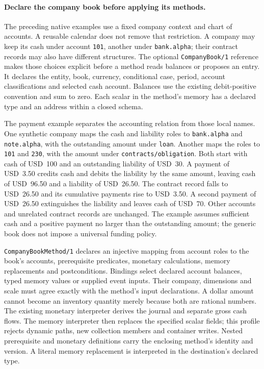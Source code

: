 \paragraph{Declare the company book before applying its methods.}
The preceding native examples use a fixed company context and chart of accounts.
A reusable calendar does not remove that restriction. A company may keep its cash
under account \texttt{101}, another under \texttt{bank.alpha}; their contract
records may also have different structures. The optional
\texttt{CompanyBook/1} reference makes those choices explicit before a method
reads balances or proposes an entry. It declares the entity, book, currency,
conditional case, period, account classifications and selected cash account.
Balances use the existing debit-positive convention and sum to zero. Each scalar
in the method's memory has a declared type and an address within a closed schema.

The payment example separates the accounting relation from those local names.
One synthetic company maps the cash and liability roles to
\texttt{bank.alpha} and \texttt{note.alpha}, with the outstanding amount under
\texttt{loan}. Another maps the roles to \texttt{101} and \texttt{230}, with the
amount under \texttt{contracts/obligation}. Both start with cash of USD~100 and an
outstanding liability of USD~30. A payment of USD~3.50 credits cash and debits
the liability by the same amount, leaving cash of USD~96.50 and a liability of
USD~26.50. The contract record falls to USD~26.50 and its cumulative payments
rise to USD~3.50. A second payment of USD~26.50 extinguishes the liability and
leaves cash of USD~70. Other accounts and unrelated contract records are unchanged.
The example assumes sufficient cash and a positive payment no larger than the
outstanding amount; the generic book does not impose a universal funding policy.

\texttt{CompanyBookMethod/1} declares an injective mapping from account roles to
the book's accounts, prerequisite predicates, monetary calculations, memory
replacements and postconditions. Bindings select declared account balances,
typed memory values or supplied event inputs. Their company, dimensions and
scale must agree exactly with the method's input declarations. A dollar amount
cannot become an inventory quantity merely because both are rational numbers.
The existing monetary interpreter derives the journal and separate gross cash
flows. The memory interpreter then replaces the specified scalar fields; this
profile rejects dynamic paths, new collection members and container writes.
Nested prerequisite and monetary definitions carry the enclosing method's
identity and version. A literal memory replacement is interpreted in the
destination's declared type.

